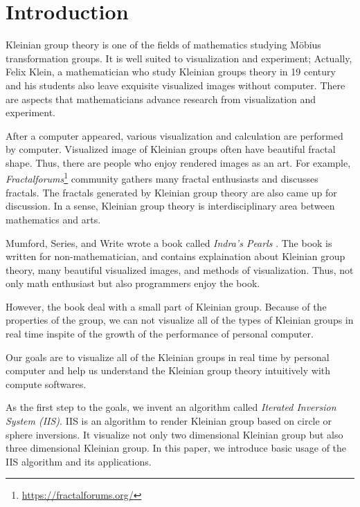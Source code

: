 

\section{Introduction}

Kleinian group theory is one of the fields of mathematics studying 
M\"obius transformation groups.
It is well suited to visualization and experiment;
Actually, Felix Klein, a mathematician who study Kleinian groups theory
in 19 century and his students also leave exquisite visualized images
without computer.
There are aspects that mathematicians advance research from
visualization and experiment.

After a computer appeared, various visualization and calculation are
performed by computer.
Visualized image of Kleinian groups often have beautiful fractal shape.
Thus, there are people who enjoy rendered images as an art.
For example,
\textit{Fractalforums}\footnote{\url{https://fractalforums.org/}}
community gathers many fractal enthusiasts and discusses fractals.
The fractals generated by Kleinian group theory are also came up for
discussion.
In a sense, Kleinian group theory is interdisciplinary area between
mathematics and arts.

Mumford, Series, and Write wrote a book called
\textit{Indra's Pearls} \cite{MumfordSeriesWright200204}.
The book is written for non-mathematician, and contains explaination
about Kleinian group theory, many beautiful visualized images, and
methods of visualization.
Thus, not only math enthusiast but also programmers enjoy the book.

However, the book deal with a small part of Kleinian group.
Because of the properties of the group, we can not
visualize all of the types of Kleinian groups in real time
inspite of the growth of the performance of personal computer.

Our goals are to visualize all of the Kleinian groups in real time by
personal computer and help us understand the Kleinian group theory
intuitively with compute softwares.

As the first step to the goals, we invent an algorithm called
\textit{Iterated Inversion System (IIS)}.
IIS is an algorithm to render Kleinian group based on circle or sphere
inversions.
It visualize not only two dimensional Kleinian group but also three
dimensional Kleinian group.
In this paper, we introduce basic usage of the IIS algorithm and its
applications.
